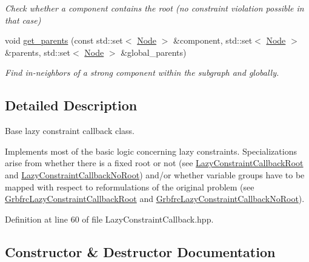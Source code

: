 \begin{DoxyCompactItemize}
\begin{DoxyCompactList}\small\item\em Check whether a component contains the root (no constraint violation possible in that case) \end{DoxyCompactList}\item 
void \hyperlink{classderegnet_1_1LazyConstraintCallback_ab1357c9415e190aaa56ed87022ec0b82}{get\+\_\+parents} (const std\+::set$<$ \hyperlink{namespacederegnet_a744bad34f2de9856d36715a445f027f3}{Node} $>$ \&component, std\+::set$<$ \hyperlink{namespacederegnet_a744bad34f2de9856d36715a445f027f3}{Node} $>$ \&parents, std\+::set$<$ \hyperlink{namespacederegnet_a744bad34f2de9856d36715a445f027f3}{Node} $>$ \&global\+\_\+parents)
\begin{DoxyCompactList}\small\item\em Find in-\/neighbors of a strong component within the subgraph and globally. \end{DoxyCompactList}\end{DoxyCompactItemize}


\subsection{Detailed Description}
Base lazy constraint callback class. 

Implements most of the basic logic concerning lazy constraints. Specializations arise from whether there is a fixed root or not (see \hyperlink{classderegnet_1_1LazyConstraintCallbackRoot}{Lazy\+Constraint\+Callback\+Root} and \hyperlink{classderegnet_1_1LazyConstraintCallbackNoRoot}{Lazy\+Constraint\+Callback\+No\+Root}) and/or whether variable groups have to be mapped with respect to reformulations of the original problem (see \hyperlink{classderegnet_1_1GrbfrcLazyConstraintCallbackRoot}{Grbfrc\+Lazy\+Constraint\+Callback\+Root} and \hyperlink{classderegnet_1_1GrbfrcLazyConstraintCallbackNoRoot}{Grbfrc\+Lazy\+Constraint\+Callback\+No\+Root}). 

Definition at line 60 of file Lazy\+Constraint\+Callback.\+hpp.



\subsection{Constructor \& Destructor Documentation}
\mbox{\label{classderegnet_1_1LazyConstraintCallback_ad025c982974ffc3e70677948b9668600}} 

